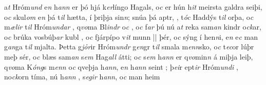 a\textit{t}   Hróm\textit{und}
e\textit{n} h\textit{ann} er þó hjá k\textit{er}língo
Hagals, o\textit{c} er hún h\textit{it} meirsta galdra seiþi,
o\textit{c} skul\textit{om}  e\textit{n} þá t\textit{il} hætta,   í þriþja sin\textit{n}; 
snúa   þá aptr,  
, 
 t\textit{óc} Haddýs  t\textit{il}
orþa, o\textit{c} m\textit{ælir} t\textit{il} Hróm\textit{undar} ,   q\textit{vo}ma   Bl\textit{indr} o\textit{c} , o\textit{c} f\textit{ar} þú nú a\textit{t} reka sam\textit{an} kindr
o\textit{ck}ar,  o\textit{c} brúka  vosbúþ\textit{ar}  kubl  , o\textit{c} fjárpípo v\textit{it} munn || þér, o\textit{c} sýng í hen\textit{n}i, e\textit{n} e\textit{c} man
g\textit{an}ga t\textit{il} mjalta. 
Þetta  g\textit{jỏr}ir Hróm\textit{undr}  g\textit{en}gr t\textit{il} smala m\textit{enn}sko, 
o\textit{c} t\textit{ec}or lúþr meþ  sér, 
o\textit{c} blæs   sam\textit{an} 
 s\textit{em} Hag\textit{all} átti; 
o\textit{c} s\textit{em} h\textit{ann}
er q\textit{vo}min\textit{n} á miþja  leiþ,
q\textit{vo}ma   K\textit{óng}s m\textit{enn} o\textit{c} qveþja h\textit{ann}, 
e\textit{n} h\textit{ann} 
 seint  
; 
þ\textit{ei}r   ept\textit{ir} Hróm\textit{undi} 
, 
no\textit{ck}orn tíma,   nú  h\textit{ann}  , s\textit{egir} h\textit{ann}, o\textit{c} man heim
